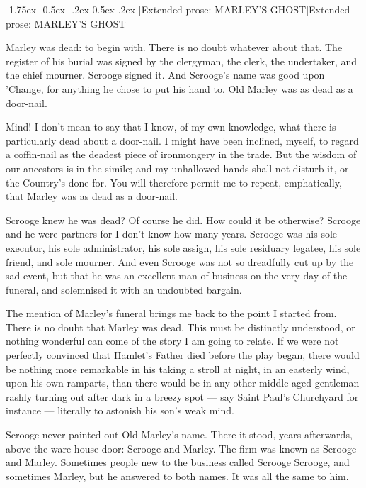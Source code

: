 \documentclass[11pt,twoside]{article}\makeatletter
\makeatletter
\renewcommand\section{\@startsection {section}{1}{\z@}%
     {-1.75ex \@plus -0.5ex \@minus -.2ex}%
     {0.5ex \@plus .2ex}%
     {\reset@font\Large\bfseries\sffamily}}
\makeatother
\begin{document}
\section[{Extended prose: MARLEY'S GHOST}]{Extended prose: MARLEY'S GHOST}\label{S1}%
\par
Marley was dead: to begin with. There is no doubt whatever about that. The register of his burial was signed by the clergyman, the clerk, the undertaker, and the chief mourner. Scrooge signed it. And Scrooge's name was good upon 'Change, for anything he chose to put his hand to. Old Marley was as dead as a door-nail. \par
Mind! I don't mean to say that I know, of my own knowledge, what there is particularly dead about a door-nail. I might have been inclined, myself, to regard a coffin-nail as the deadest piece of ironmongery in the trade. But the wisdom of our ancestors is in the simile; and my unhallowed  hands shall not disturb it, or the Country's done for. You will therefore permit me to repeat, emphatically, that Marley was as dead as a door-nail.\par
Scrooge knew he was dead? Of course he did. How could it be otherwise? Scrooge and he were partners for I don't know how many years. Scrooge was his sole executor, his sole administrator, his sole assign, his sole residuary legatee, his sole friend, and sole mourner. And even Scrooge was not so dreadfully cut up by the sad event, but that he was an excellent man of business on the very day of the funeral, and solemnised it with an undoubted bargain. \par
The mention of Marley's funeral brings me back to the point I started from. There is no doubt that Marley was dead. This must be distinctly understood, or nothing wonderful can come of the story I am going to relate. If we were not perfectly convinced that Hamlet's Father died before the play began, there would be nothing more remarkable in his taking a stroll at night, in an easterly wind, upon his own ramparts, than there  would be in any other middle-aged gentleman rashly turning out after dark in a breezy spot — say Saint Paul's Churchyard for instance — literally to astonish his son's weak mind.\par
Scrooge never painted out Old Marley's name. There it stood, years afterwards, above the ware-house door: Scrooge and Marley. The firm was known as Scrooge and Marley. Sometimes people new to the business called Scrooge Scrooge, and sometimes Marley, but he answered to both names. It was all the same to him. \par
\end{document}
